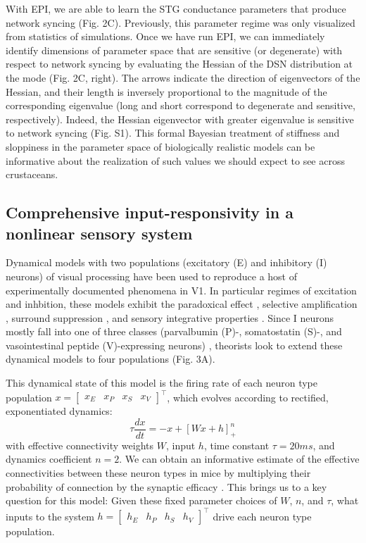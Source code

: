 \documentclass[11pt]{article}
\begin{document}
With EPI, we are able to learn the STG conductance parameters that produce network syncing (Fig. 2C). Previously, this parameter regime was only visualized from statistics of simulations. Once we have run EPI, we can immediately identify dimensions of parameter space that are sensitive (or degenerate) with respect to network syncing by evaluating the Hessian of the DSN distribution at the mode (Fig. 2C, right).  The arrows indicate the direction of eigenvectors of the Hessian, and their length is inversely proportional to the magnitude of the corresponding eigenvalue (long and short correspond to degenerate and sensitive, respectively).  Indeed, the Hessian eigenvector with greater eigenvalue is sensitive to network syncing (Fig. S1).  This formal Bayesian treatment of stiffness and sloppiness in the parameter space of biologically realistic models can be informative about the realization of such values we should expect to see across crustaceans.

\subsection{Comprehensive input-responsivity in a nonlinear sensory system}
Dynamical models with two populations (excitatory (E) and inhibitory (I) neurons) of visual processing have been used to reproduce a host of experimentally documented phenomena in V1.  In particular regimes of excitation and inhbition, these models exhibit the paradoxical effect \cite{tsodyks1997paradoxical}, selective amplification \cite{murphy2009balanced}, surround suppression \cite{ozeki2009inhibitory}, and  sensory integrative properties \cite{rubin2015stabilized}.  Since I neurons mostly fall into one of three classes (parvalbumin (P)-, somatostatin (S)-, and vasointestinal peptide (V)-expressing neurons) \cite{markram2004interneurons, rudy2011three}, theorists look to extend these dynamical models to four populations \cite{litwin2016inhibitory} (Fig. 3A).

This dynamical state of this model is the firing rate of each neuron type population $x = \begin{bmatrix} x_E & x_P & x_S & x_V \end{bmatrix}^\top$, which evolves according to rectified, exponentiated dynamics:
\begin{equation}
\tau \frac{dx}{dt} = -x + [W x+ h]_+^n
\end{equation}
with effective connectivity weights $W$, input $h$, time constant $\tau = 20ms$, and dynamics coefficient $n = 2$.
We can obtain an informative estimate of the effective connectivities between these neuron types in mice by multiplying their probability of connection by the synaptic efficacy \cite{allen}.
This brings us to a key question for this model: Given these fixed parameter choices of $W$, $n$, and $\tau$, what inputs to the system $h = \begin{bmatrix} h_E & h_P & h_S & h_V \end{bmatrix}^\top$ drive each neuron type population.
\end{document}
